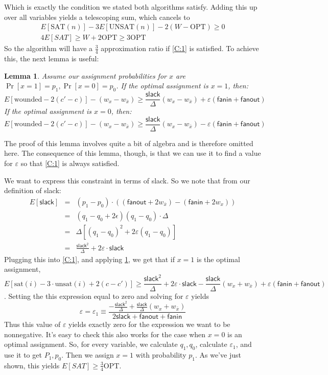 \documentclass[11pt,letter]{article}
\newtheorem{lemma}{Lemma}
\begin{document}
Which is exactly the condition we stated both algorithms satisfy. Adding this up over all variables yields a telescoping sum, which cancels to
\begin{eqnarray}
E[\mathrm{SAT}(n)] - 3E[\mathrm{UNSAT}(n)] - 2(W-\mathrm{OPT}) \ge 0
\\4E[SAT] \ge W + 2\mathrm{OPT} \ge 3\mathrm{OPT}
\end{eqnarray}
So the algorithm will have a $\frac{3}{4}$ approximation ratio if \ref{C:1} is satisfied. To achieve this, the next lemma is useful:
\begin{lemma} \label{L:3}
Assume our assignment probabilities for $x$ are $\Pr[x = 1] = p_1, \Pr[x=0] = p_0$. If the optimal assignment is $x=1$, then:
\[E[\mathrm{wounded} - 2(c'-c)] - (w_x - w_{\bar{x}}) \ge \frac{\mathsf{slack}}{\Delta}(w_x - w_{\bar{x}}) + \varepsilon(\mathsf{fanin} + \mathsf{fanout})\]
If the optimal assignment is  $x=0$, then:
\[E[\mathrm{wounded} - 2(c'-c)] - (w_x - w_{\bar{x}}) \ge \frac{\mathsf{slack}}{\Delta}(w_x - w_{\bar{x}}) - \varepsilon(\mathsf{fanin} + \mathsf{fanout})\]
\end{lemma}
The proof of this lemma involves quite a bit of algebra and is therefore omitted here. The consequence of this lemma, though, is that we can use it to find a value for $\varepsilon$ so that  \ref{C:1} is always satisfied.

We want to express this constraint in terms of slack. So we note that from our definition of slack:
\begin{eqnarray}
E[\mathsf{slack}] &=& (p_1-p_0)\cdot ((\mathsf{fanout} + 2w_{\bar{x}}) -(\mathsf{fanin} + 2w_x))
\\&=& (q_1-q_0+2\epsilon)(q_1-q_0)\cdot\Delta
\\&=& \Delta[(q_1-q_0)^2 + 2\varepsilon(q_1-q_0)]
\\&=& \frac{\mathsf{slack}^2}{\Delta} +2\varepsilon\cdot\mathsf{slack}
\end{eqnarray}
Plugging this into \ref{C:1}, and applying \ref{L:3}, we get that if $x=1$ is the optimal assignment,
\[E[\mathrm{sat}(i) - 3\cdot\mathrm{unsat}(i)+ 2(c-c')] \ge \frac{\mathsf{slack}^2}{\Delta} +2\varepsilon\cdot\mathsf{slack} - \frac{\mathsf{slack}}{\Delta}(w_x + w_{\bar{x}}) + \varepsilon(\mathsf{fanin} + \mathsf{fanout})\].
Setting the this expression equal to zero and solving for $\varepsilon$ yields
\begin{equation}
\varepsilon = \varepsilon_1 \equiv \frac{-\frac{\mathsf{slack}^2}{\Delta} + \frac{\mathsf{slack}}{\Delta}(w_x + w_{\bar{x}})}{2\mathsf{slack}+ \mathsf{fanout} + \mathsf{fanin}}
\end{equation}
Thus this value of $\varepsilon$ yields exactly zero for the expression we want to be nonnegative. It's easy to check this also works for the case when $x=0$ is an optimal assignment. So, for every variable, we calculate $q_1, q_0$, calculate $\varepsilon_1$, and use it to get $P_1, p_0$. Then we assign $x=1$ with probability $p_1$. As we've just shown, this yields $E[SAT] \ge \frac{3}{4}\mathrm{OPT}$.
\end{document}
